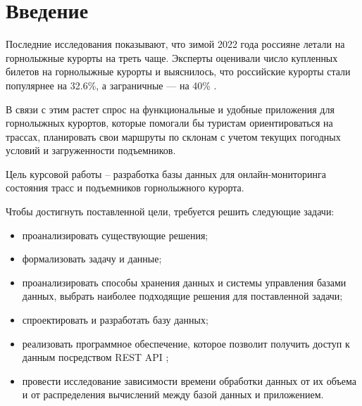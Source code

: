 \chapter*{Введение}

Последние исследования показывают, что зимой 2022 года россияне летали на горнолыжные курорты на треть чаще. Эксперты оценивали число купленных билетов на горнолыжные курорты и выяснилось, что российские курорты стали популярнее на 32.6\%, а заграничные — на 40\% \cite{stat}.

В связи с этим растет спрос на функциональные и удобные приложения для горнолыжных курортов, которые помогали бы туристам ориентироваться на трассах, планировать свои маршруты по склонам с учетом текущих погодных условий и загруженности подъемников.

Цель курсовой работы -- разработка базы данных для онлайн-мониторинга состояния трасс и подъемников горнолыжного курорта. 



Чтобы достигнуть поставленной цели, требуется решить следующие задачи:

\begin{itemize}
	\item проанализировать существующие решения;
	\item формализовать задачу и данные;
	\item проанализировать способы хранения данных и системы управления базами данных, выбрать наиболее подходящие решения для поставленной задачи;
	\item спроектировать и разработать базу данных;
    \item  реализовать программное обеспечение, которое позволит получить доступ к данным посредством REST API \cite{api};
    \item провести исследование зависимости времени обработки данных от их объема и от распределения вычислений между базой данных и приложением.
\end{itemize}

